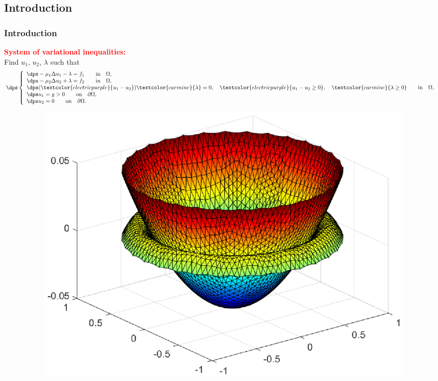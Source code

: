 \documentclass[10 pt]{beamer}
\begin{document}
\subsection{Introduction}
\begin{frame}[t]
\frametitle{Introduction}
\textcolor{red}{\textbf{System of variational inequalities:}}\\
Find $u_1$, $u_2$, $\lambda$ such that
\begin{equation*}
\dps
\left\lbrace\begin{array}{llccc}
\dps -\mu_1 \Delta u_1-\lambda = f_1 \qquad \mbox{in} \quad \Omega, \\
\dps -\mu_2 \Delta u_2+\lambda = f_2 \qquad \mbox{in} \quad \Omega,\\
\dps (\textcolor{electricpurple}{u_1-u_2})\textcolor{carmine}{\lambda}=0, \quad \textcolor{electricpurple}{u_1-u_2 \geq 0}, \quad 
\textcolor{carmine}{\lambda \geq 0} \qquad \mbox{in} \quad \Omega, \hspace{0.2 cm}\\
\dps u_1=g > 0 \qquad \mbox{on} \quad\partial \Omega,\\
\dps u_2=0 \qquad \mbox{on} \quad\partial \Omega.
\end{array}
\right.
\end{equation*}
\vspace{-0.75cm}
\begin{figure}[t]
\begin{subfigure}[normal]{0.5\textwidth} 
\includegraphics[width=\textwidth]{position_membrane_exact_resolution_convergence.eps}    
\label{ref:position_membrane_convergence}


\end{subfigure}
\end{figure}
\end{frame}
\end{document}
